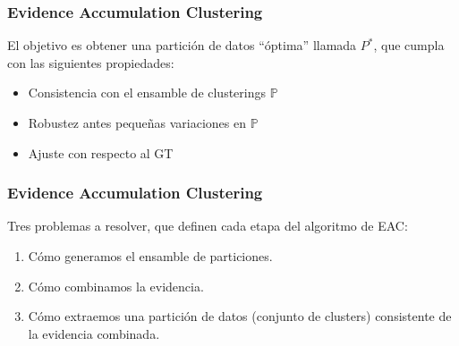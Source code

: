\iflong
\begin{frame}
\frametitle{Evidence Accumulation Clustering}

El objetivo es obtener una partición de datos ``óptima'' llamada $P^*$, que cumpla con las siguientes propiedades:
\begin{itemize}
    \item<1-> Consistencia con el ensamble de clusterings $\mathbb{P}$
    \item<2-> Robustez antes pequeñas variaciones en $\mathbb{P}$
    \item<3-> Ajuste con respecto al \gls{GT}
\end{itemize}


\end{frame}
\fi








\begin{frame}
\frametitle{Evidence Accumulation Clustering}

Tres problemas a resolver, que definen cada etapa del algoritmo de \gls{EAC}:

\begin{enumerate}
    \item  Cómo generamos el ensamble de particiones.
    \item  Cómo combinamos la evidencia.
    \item  Cómo extraemos una partición de datos (conjunto de clusters) consistente de la evidencia combinada.
\end{enumerate}


\end{frame}


